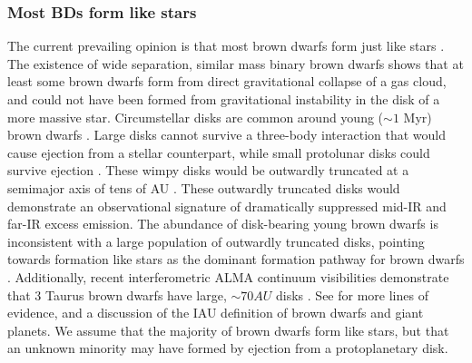 \subsubsection{Most BDs form like stars}
The current prevailing opinion is that most brown dwarfs form just like stars \citep{2014prpl.conf..619C}.  The existence of wide separation, similar mass binary brown dwarfs \citep{2004ApJ...614..398L,2006PhDT.........2A,2007ApJ...660.1492C,2009ApJ...691.1265L} shows that at least some brown dwarfs form from direct gravitational collapse of a gas cloud, and could not have been formed from gravitational instability in the disk of a more massive star.  Circumstellar disks are common around young ($\sim 1$ Myr) brown dwarfs \citep{2005ApJ...635L..93L,allers06,2012ARA&A..50...65L,2013A&A...559A.126A}.  Large disks cannot survive a three-body interaction that would cause ejection from a stellar counterpart, while small protolunar disks could survive ejection \citep{2009MNRAS.392..413S}.  These wimpy disks would be outwardly truncated at a semimajor axis of tens of AU \citep{2009MNRAS.392..413S}.  These outwardly truncated disks would demonstrate an observational signature of dramatically suppressed mid-IR and far-IR excess emission.  The abundance of disk-bearing young brown dwarfs is inconsistent with a large population of outwardly truncated disks, pointing towards formation like stars as the dominant formation pathway for brown dwarfs \citep{2012ARA&A..50...65L}.  Additionally, recent interferometric ALMA continuum visibilities demonstrate that 3 Taurus brown dwarfs have large, $\sim70 AU$ disks \citep{2014ApJ...791...20R}.  See \citet{2014prpl.conf..619C} for more lines of evidence, and a discussion of the IAU definition of brown dwarfs and giant planets.  We assume that the majority of brown dwarfs form like stars, but that an unknown minority may have formed by ejection from a protoplanetary disk.


